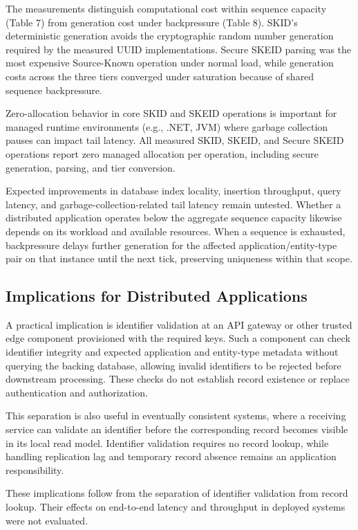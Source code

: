 \documentclass[fleqn,10pt]{wlpeerj}
\begin{document}
The measurements distinguish computational cost within sequence capacity
(Table 7) from generation cost under backpressure (Table 8). SKID's
deterministic generation avoids the cryptographic random number
generation required by the measured UUID implementations. Secure SKEID
parsing was the most expensive Source-Known operation under normal load,
while generation costs across the three tiers converged under saturation
because of shared sequence backpressure.

Zero-allocation behavior in core SKID and SKEID operations is important
for managed runtime environments (e.g., .NET, JVM) where garbage
collection pauses can impact tail latency. All measured SKID, SKEID, and
Secure SKEID operations report zero managed allocation per operation,
including secure generation, parsing, and tier conversion.

Expected improvements in database index locality, insertion throughput,
query latency, and garbage-collection-related tail latency remain
untested. Whether a distributed application operates below the aggregate
sequence capacity likewise depends on its workload and available
resources. When a sequence is exhausted, backpressure delays further
generation for the affected application/entity-type pair on that
instance until the next tick, preserving uniqueness within that scope.

\subsection{Implications for Distributed
Applications}\label{implications-for-distributed-applications}

A practical implication is identifier validation at an API gateway or
other trusted edge component provisioned with the required keys. Such a
component can check identifier integrity and expected application and
entity-type metadata without querying the backing database, allowing
invalid identifiers to be rejected before downstream processing. These
checks do not establish record existence or replace authentication and
authorization.

This separation is also useful in eventually consistent systems, where a
receiving service can validate an identifier before the corresponding
record becomes visible in its local read model. Identifier validation
requires no record lookup, while handling replication lag and temporary
record absence remains an application responsibility.

These implications follow from the separation of identifier validation
from record lookup. Their effects on end-to-end latency and throughput
in deployed systems were not evaluated.
\end{document}
